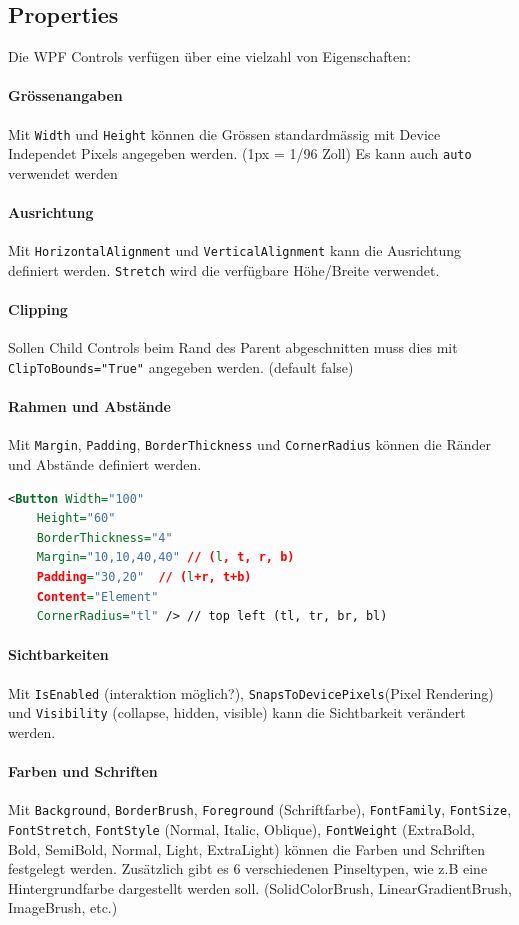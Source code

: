 \subsection{Properties}
Die WPF Controls verfügen über eine vielzahl von Eigenschaften:
\paragraph{Grössenangaben}
Mit \lstinline|Width| und \lstinline|Height| können die Grössen standardmässig mit Device Independet Pixels angegeben werden. (1px = 1/96 Zoll) Es kann auch \lstinline|auto| verwendet werden

\paragraph{Ausrichtung}
Mit \lstinline|HorizontalAlignment| und \lstinline|VerticalAlignment| kann die Ausrichtung definiert werden. \lstinline|Stretch| wird die verfügbare Höhe/Breite verwendet. 

\paragraph{Clipping}
Sollen Child Controls beim Rand des Parent abgeschnitten muss dies mit \lstinline|ClipToBounds="True"| angegeben werden. (default false)

\paragraph{Rahmen und Abstände} 
Mit \lstinline|Margin|, \lstinline|Padding|, \lstinline|BorderThickness| und \lstinline|CornerRadius| können die Ränder und Abstände definiert werden.
\begin{lstlisting}[caption=Borders, language=XML]
<Button Width="100"
	Height="60"
	BorderThickness="4"
	Margin="10,10,40,40" // (l, t, r, b)
	Padding="30,20"  // (l+r, t+b)
	Content="Element" 
	CornerRadius="tl" /> // top left (tl, tr, br, bl)
\end{lstlisting}

\paragraph{Sichtbarkeiten}
Mit \lstinline|IsEnabled| (interaktion möglich?), \lstinline|SnapsToDevicePixels|(Pixel Rendering) und \lstinline|Visibility| (collapse, hidden, visible) kann die Sichtbarkeit verändert werden.  

\paragraph{Farben und Schriften}
Mit \lstinline|Background|, \lstinline|BorderBrush|, \lstinline|Foreground| (Schriftfarbe), \lstinline|FontFamily|, \lstinline|FontSize|, \lstinline|FontStretch|, \lstinline|FontStyle| (Normal, Italic, Oblique), \lstinline|FontWeight| (ExtraBold, Bold, SemiBold, Normal, Light, ExtraLight) können die Farben und Schriften festgelegt werden. Zusätzlich gibt es 6 verschiedenen Pinseltypen, wie z.B eine Hintergrundfarbe dargestellt werden soll. (SolidColorBrush, LinearGradientBrush, ImageBrush, etc.)

